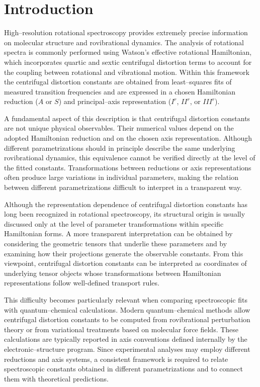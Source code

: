 \section{Introduction}

High--resolution rotational spectroscopy provides extremely precise
information on molecular structure and rovibrational dynamics.
\cite{TownesSchawlow1955,GordyCook1984,BunkerJensen2005}
The analysis of rotational spectra is commonly performed using
Watson's effective rotational Hamiltonian,
\cite{Watson1968,Watson1977}
which incorporates quartic and sextic centrifugal distortion terms to
account for the coupling between rotational and vibrational motion.
Within this framework the centrifugal distortion constants are obtained
from least--squares fits of measured transition frequencies and are
expressed in a chosen Hamiltonian reduction ($A$ or $S$) and
principal--axis representation ($I^r$, $II^r$, or $III^r$).

A fundamental aspect of this description is that centrifugal distortion
constants are not unique physical observables. Their numerical values
depend on the adopted Hamiltonian reduction and on the chosen axis
representation. Although different parametrizations should in principle
describe the same underlying rovibrational dynamics, this equivalence
cannot be verified directly at the level of the fitted constants.
Transformations between reductions or axis representations often produce
large variations in individual parameters, making the relation between
different parametrizations difficult to interpret in a transparent way.

Although the representation dependence of centrifugal distortion
constants has long been recognized in rotational spectroscopy, its
structural origin is usually discussed only at the level of parameter
transformations within specific Hamiltonian forms. A more transparent
interpretation can be obtained by considering the geometric tensors
that underlie these parameters and by examining how their projections
generate the observable constants. From this viewpoint, centrifugal
distortion constants can be interpreted as coordinates of underlying
tensor objects whose transformations between Hamiltonian
representations follow well-defined transport rules.

This difficulty becomes particularly relevant when comparing spectroscopic
fits with quantum--chemical calculations.
Modern quantum--chemical methods allow centrifugal distortion constants
to be computed from rovibrational perturbation theory or from variational
treatments based on molecular force fields.
\cite{Nielsen1951,Mills1972,Clabo1988,Barone2005,Puzzarini2010,Franke2021}
These calculations are typically reported in axis conventions defined
internally by the electronic--structure program. Since experimental
analyses may employ different reductions and axis systems, a consistent
framework is required to relate spectroscopic constants obtained in
different parametrizations and to connect them with theoretical
predictions.

